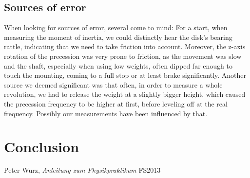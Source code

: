 \documentclass{scrreprt}
\begin{document}
\subsection{Sources of error}
When looking for sources of error, several come to mind: For a start, when measuring the moment of inertia, we could distinctly hear the disk's bearing rattle, indicating that we need to take friction into account. Moreover, the z-axis rotation of the precession was very prone to friction, as the movement was slow and the shaft, especially when using low weights, often dipped far enough to touch the mounting, coming to a full stop or at least brake significantly. Another source we deemed significant was that often, in order to measure a whole revolution, we had to release the weight at a slightly bigger height, which caused the precession frequency to be higher at first, before leveling off at the real frequency. Possibly our measurements have been influenced by that.

\section{Conclusion}

\begin{thebibliography}{9}

  Peter Wurz,
  \emph{Anleitung zum Physikpraktikum}
  FS2013

\end{thebibliography}
\end{document}
